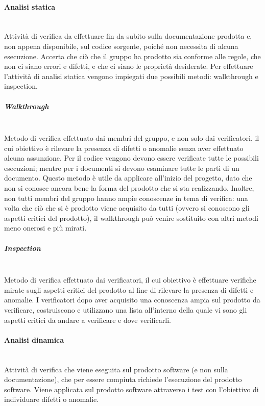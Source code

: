\paragraph{Analisi statica} \mbox{}\\
Attività di verifica da effettuare fin da subito sulla documentazione prodotta e, non appena disponibile, sul codice sorgente, poiché non necessita di alcuna esecuzione.
Accerta che ciò che il gruppo ha prodotto sia conforme alle regole, che non ci siano errori e difetti, e che ci siano le proprietà desiderate.
Per effettuare l’attività di analisi statica vengono impiegati due possibili metodi: walkthrough e inspection.
\setlength{\parindent}{-0.1em}
\subparagraph*{Walkthrough} \mbox{}\\ %
Metodo di verifica effettuato dai membri del gruppo, e non solo dai verificatori, il cui obiettivo è rilevare la presenza di difetti o anomalie senza aver effettuato alcuna assunzione.
Per il codice vengono devono essere verificate tutte le possibili esecuzioni; mentre per i documenti si devono esaminare tutte le parti di un documento.
Questo metodo è utile da applicare all’inizio del progetto, dato che non si conosce ancora bene la forma del prodotto che si sta realizzando.
Inoltre, non tutti membri del gruppo hanno ampie conoscenze in tema di verifica: una volta che ciò che si è prodotto viene acquisito da tutti (ovvero si conoscono gli aspetti critici del prodotto), il walkthrough può venire sostituito con altri metodi meno onerosi e più mirati.
\subparagraph*{Inspection} \mbox{}\\
Metodo di verifica effettuato dai verificatori, il cui obiettivo è effettuare verifiche mirate sugli aspetti critici del prodotto al fine di rilevare la presenza di difetti e anomalie.
I verificatori dopo aver acquisito una conoscenza ampia sul prodotto da verificare, costruiscono e utilizzano una lista all’interno della quale vi sono gli aspetti critici da andare a verificare e dove verificarli.

\paragraph{Analisi dinamica} \mbox{}\\
Attività di verifica che viene eseguita sul prodotto software (e non sulla documentazione), che per essere compiuta richiede l’esecuzione del prodotto software.
Viene applicata sul prodotto software attraverso i test con l’obiettivo di individuare difetti o anomalie.

